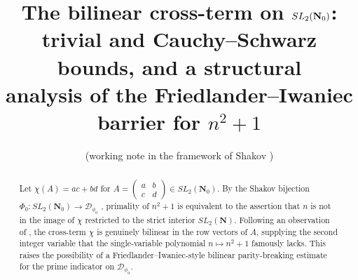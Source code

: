 \documentclass[11pt]{article}
\title{The bilinear cross-term on $\SLNz$:\\
trivial and Cauchy--Schwarz bounds, and a structural\\
analysis of the Friedlander--Iwaniec barrier for $n^{2}+1$}
\author{(working note in the framework of Shakov \cite{shakov})}
\date{}
\theoremstyle{definition}
\newcommand{\N}{\mathbf{N}}
\newcommand{\Nz}{\mathbf{N}_0}
\newcommand{\SLNz}{SL_2(\Nz)}
\newcommand{\SLN}{SL_2(\N)}
\newcommand{\Dphi}{\mathcal{D}_{\phi_0}}
\begin{document}
\maketitle

\begin{abstract}
Let $\chi(A)=ac+bd$ for $A=\begin{pmatrix}a & b\\ c & d\end{pmatrix}\in\SLNz$.
By the Shakov bijection $\Phi_{0}\colon\SLNz\to\Dphi$ \cite{shakov}, primality of
$n^{2}+1$ is equivalent to the assertion that $n$ is not in the image of
$\chi$ restricted to the strict interior $\SLN$. Following an observation
of \cite{notes-B7,notes-B5}, the cross-term $\chi$ is genuinely bilinear in
the row vectors of $A$, supplying the second integer variable that the
single-variable polynomial $n\mapsto n^{2}+1$ famously lacks. This raises
the possibility of a Friedlander--Iwaniec-style \cite{FI98a,FI98b} bilinear
parity-breaking estimate for the prime indicator on $\Dphi$.


\end{abstract}
\end{document}
